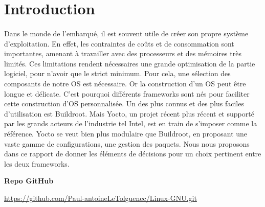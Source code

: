 \section{Introduction}
\paragraph{}
Dans le monde de l'embarqué, il est souvent utile de créer son propre système d'exploitation. En effet, les contraintes de coûts et de consommation sont importantes, amenant à travailler avec des processeurs et des mémoires très limités. Ces limitations rendent nécessaires une grande optimisation de la partie logiciel, pour n'avoir que le strict minimum. Pour cela, une sélection des composants de notre OS est nécessaire.
Or la construction d'un OS peut être longue et délicate. C'est pourquoi différents frameworks sont nés pour faciliter cette construction d'OS personnalisée. Un des plus connus et des plus faciles d'utilisation est Buildroot. Mais Yocto, un projet récent plus récent et supporté par les grands acteurs de l'industrie tel Intel, est en train de s'imposer comme la référence. Yocto se veut bien plus modulaire que Buildroot, en proposant une vaste gamme de configurations, une gestion des paquets. Nous nous proposons dans ce rapport de donner les éléments de décisions pour un choix pertinent entre les deux frameworks.


\textbf{Repo GitHub}

\url{https://github.com/Paul-antoineLeTolguenec/Linux-GNU.git}

\newpage

